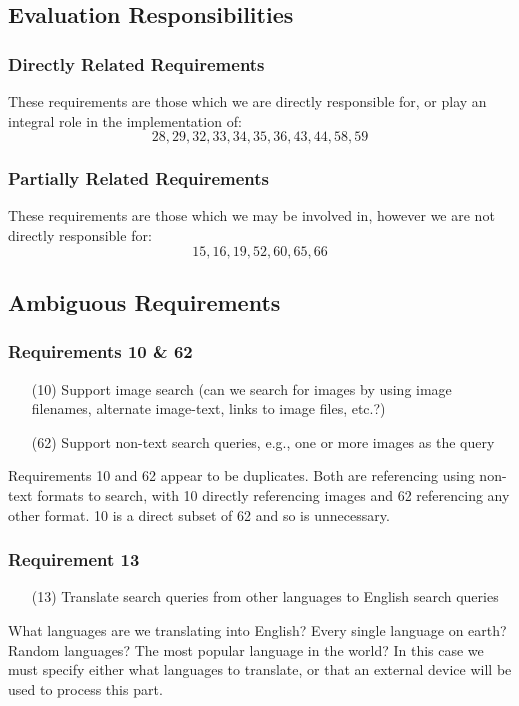 \subsection*{Evaluation Responsibilities}
\subsubsection*{Directly Related Requirements}
These requirements are those which we are directly responsible for, or play an integral role in the implementation of:
$$ 28, 29, 32, 33, 34, 35, 36, 43, 44, 58, 59 $$
\subsubsection*{Partially Related Requirements}
These requirements are those which we may be involved in, however we are not directly responsible for:
$$ 15, 16, 19, 52, 60, 65, 66 $$

\subsection*{Ambiguous Requirements}
\subsubsection*{Requirements 10 \& 62}
\begin{itemize}
  \item[(10)] Support image search (can we search for images by using image filenames, alternate image-text, links to image files, etc.?)
  \item[(62)] Support non-text search queries, e.g., one or more images as the query
\end{itemize}

Requirements 10 and 62 appear to be duplicates. Both are referencing using non-text formats to search, with 10 directly referencing images and 62 referencing any other format. 10 is a direct subset of 62 and so is unnecessary.

\subsubsection*{Requirement 13}
\begin{itemize}
  \item[(13)] Translate search queries from other languages to English search queries
\end{itemize}

What languages are we translating into English? Every single language on earth? Random languages? The most popular language in the world? In this case we must specify either what languages to translate, or that an external device will be used to process this part.

